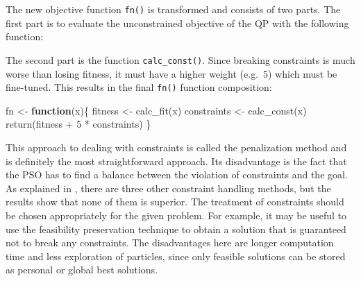 \documentclass[
  oneside]{book}
\newenvironment{Shaded}{\begin{snugshade}}{\end{snugshade}}
\newcommand{\ControlFlowTok}[1]{\textcolor[rgb]{0.13,0.29,0.53}{\textbf{#1}}}
\newcommand{\DecValTok}[1]{\textcolor[rgb]{0.00,0.00,0.81}{#1}}
\newcommand{\FloatTok}[1]{\textcolor[rgb]{0.00,0.00,0.81}{#1}}
\newcommand{\FunctionTok}[1]{\textcolor[rgb]{0.00,0.00,0.00}{#1}}
\newcommand{\NormalTok}[1]{#1}
\newcommand{\OtherTok}[1]{\textcolor[rgb]{0.56,0.35,0.01}{#1}}
\newcommand{\SpecialCharTok}[1]{\textcolor[rgb]{0.00,0.00,0.00}{#1}}
\begin{document}
The new objective function \texttt{fn()} is transformed and consists of two parts. The first part is to evaluate the unconstrained objective of the QP with the following function:

\begin{Shaded}
\end{Shaded}

The second part is the function \texttt{calc\_const()}. Since breaking constraints is much worse than losing fitness, it must have a higher weight (e.g.~5) which must be fine-tuned. This results in the final \texttt{fn()} function composition:

\begin{Shaded}
\begin{Highlighting}[]
\NormalTok{fn }\OtherTok{\textless{}{-}} \ControlFlowTok{function}\NormalTok{(x)\{}
\NormalTok{  fitness }\OtherTok{\textless{}{-}} \FunctionTok{calc\_fit}\NormalTok{(x)}
\NormalTok{  constraints }\OtherTok{\textless{}{-}} \FunctionTok{calc\_const}\NormalTok{(x)}
  \FunctionTok{return}\NormalTok{(fitness }\SpecialCharTok{+} \DecValTok{5} \SpecialCharTok{*}\NormalTok{ constraints)}
\NormalTok{\}}
\end{Highlighting}
\end{Shaded}

This approach to dealing with constraints is called the penalization method and is definitely the most straightforward approach. Its disadvantage is the fact that the PSO has to find a balance between the violation of constraints and the goal. As explained in \citep{InSi2008}, there are three other constraint handling methods, but the results show that none of them is superior. The treatment of constraints should be chosen appropriately for the given problem. For example, it may be useful to use the feasibility preservation technique to obtain a solution that is guaranteed not to break any constraints. The disadvantages here are longer computation time and less exploration of particles, since only feasible solutions can be stored as personal or global best solutions.
\end{document}
